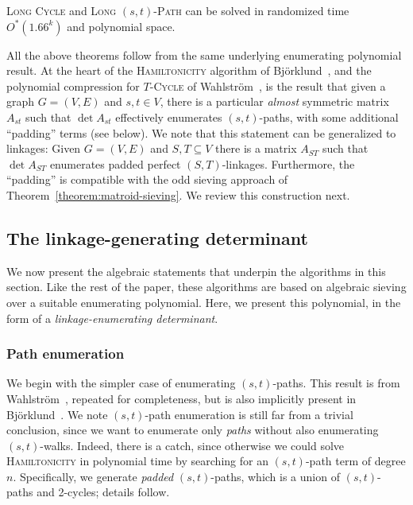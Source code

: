 \documentclass{theoretics}
\begin{document}
\begin{theorem}
  \label{thm:long-st-path}
  \textsc{Long Cycle} and \textsc{Long $(s,t)$-Path} can be solved in
  randomized time $O^*(1.66^k)$ and polynomial space.
\end{theorem}

All the above theorems follow from the same underlying enumerating
polynomial result. At the heart of the \textsc{Hamiltonicity}
algorithm of Björklund~\cite{Bjorklund14detsum},
and the polynomial compression for \textsc{$T$-Cycle} of Wahlström~\cite{Wahlstrom13STACS},
is the result that given a graph $G=(V,E)$ and $s, t \in V$, 
there is a particular \emph{almost} symmetric matrix $A_{st}$
such that $\det A_{st}$ effectively enumerates $(s,t)$-paths, with
some additional ``padding'' terms (see below).
We note that this statement can be generalized to linkages:
Given $G=(V,E)$ and $S, T \subseteq V$ there is a matrix $A_{ST}$
such that $\det A_{ST}$ enumerates padded perfect $(S,T)$-linkages. 
Furthermore, the ``padding'' is compatible with the odd sieving
approach of Theorem~\ref{theorem:matroid-sieving}. We review this
construction next.

\subsection{The linkage-generating determinant}

We now present the algebraic statements that underpin the algorithms
in this section. Like the rest of the paper, these algorithms are based on
algebraic sieving over a suitable enumerating polynomial.
Here, we present this polynomial, in the form of a
\emph{linkage-enumerating determinant}.

\subsubsection{Path enumeration}

We begin with the simpler case of enumerating $(s,t)$-paths. This result
is from Wahlström~\cite{Wahlstrom13STACS}, repeated for completeness,
but is also implicitly present in Björklund~\cite{Bjorklund14detsum}.
We note $(s,t)$-path enumeration is still far from a trivial conclusion, since we
want to enumerate only \emph{paths} without also enumerating $(s,t)$-walks.
Indeed, there is a catch, since otherwise we could solve
\textsc{Hamiltonicity} in polynomial time by searching for an
$(s,t)$-path term of degree $n$. Specifically, we generate
\emph{padded} $(s,t)$-paths, which is a union of $(s,t)$-paths and 2-cycles;
details follow.
\end{document}
